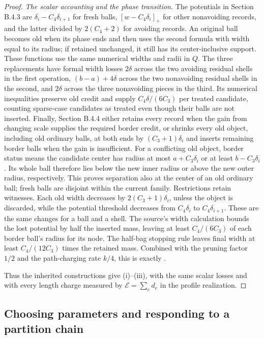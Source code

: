 \begin{proof}
\emph{The scalar accounting and the phase transition.}
The potentials in Section B.4.3 are
$\delta_i-C_4\delta_{i+1}$ for fresh balls,
$[w-C_4\delta_i]_+$ for other nonavoiding records, and the
latter divided by $2(C_4+2)$ for avoiding records.
An original ball becomes old when its phase ends and then uses the
second formula with width equal to its radius; if retained unchanged,
it still has its center-inclusive support.  These functions use the
same numerical widths and radii in $Q$.  The three
replacements have formal width losses $2\delta$ across the two avoiding residual
shells in the first operation, $(b-a)+4\delta$ across the two
nonavoiding residual shells in the second, and $2\delta$ across
the three nonavoiding pieces in the third.  Its numerical
inequalities preserve old credit and supply
$C_4\delta/(6C_3)$ per treated candidate, counting sparse-case
candidates as treated even though their balls are not inserted.
Finally, Section B.4.4 either retains every record when the gain
from changing scale supplies the required border credit, or shrinks
every old object, including old ordinary balls, at both ends by
$(C_3+1)\delta_i$ and inserts remaining border balls when the
gain is insufficient.  For a conflicting old object, border status
means the candidate center has radius at most $a+C_3\delta_i$
or at least $b-C_3\delta_i$.  Its whole ball therefore lies below
the new inner radius or above the new outer radius, respectively.
This proves separation also at the center of an old ordinary ball;
fresh balls are disjoint within the current family.  Restrictions
retain witnesses.  Each old width decreases by
$2(C_3+1)\delta_i$, unless the object is discarded, while the
potential threshold decreases from $C_4\delta_i$ to
$C_4\delta_{i+1}$.  These are the same changes for a ball and a
shell.  The source's width
calculation bounds the lost potential by half the inserted
mass, leaving at least $C_4/(6C_3)$ of each border ball's radius
for its node.  The half-bag stopping rule leaves final width at
least $C_4/(12C_3)$ times the retained mass.  Combined with the
pruning factor $1/2$ and the path-charging rate $k/4$, this is
exactly .

Thus the inherited constructions give (i)--(iii), with the same
scalar losses and with every length charge measured by
$\mathcal E=\sum_e d_e$ in the profile realization.
\end{proof}

\subsection{Choosing parameters and responding to a partition chain}

